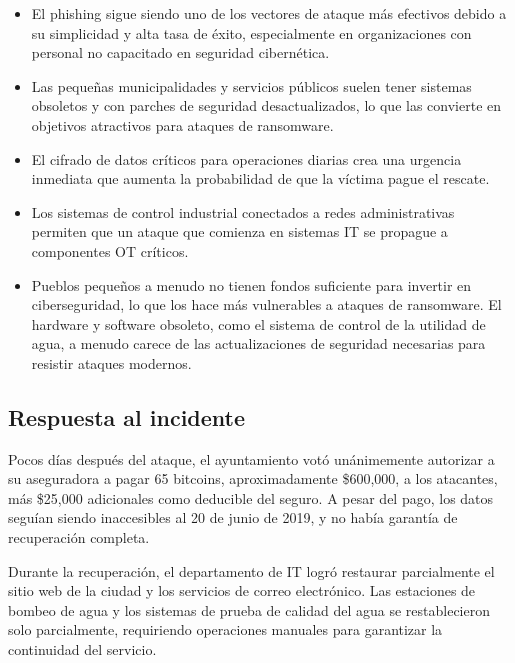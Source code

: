 \begin{itemize}
    \item El phishing sigue siendo uno de los vectores de ataque más efectivos debido a su simplicidad y alta tasa de éxito, especialmente en organizaciones con personal no capacitado en seguridad cibernética.
    
    \item Las pequeñas municipalidades y servicios públicos suelen tener sistemas obsoletos y con parches de seguridad desactualizados, lo que las convierte en objetivos atractivos para ataques de ransomware.
    
    \item El cifrado de datos críticos para operaciones diarias crea una urgencia inmediata que aumenta la probabilidad de que la víctima pague el rescate.
    
    \item Los sistemas de control industrial conectados a redes administrativas permiten que un ataque que comienza en sistemas IT se propague a componentes OT críticos.
    
    \item Pueblos pequeños a menudo no tienen fondos suficiente para invertir en ciberseguridad, lo que los hace más vulnerables a ataques de ransomware.
    El hardware y software obsoleto, como el sistema de control de la utilidad de agua, a menudo carece de las actualizaciones de seguridad necesarias para resistir ataques modernos.
\end{itemize}



\subsection{Respuesta al incidente}
Pocos días después del ataque, el ayuntamiento votó unánimemente autorizar a su aseguradora a pagar 65 bitcoins, aproximadamente \$600,000, a los atacantes, más \$25,000 adicionales como deducible del seguro. A pesar del pago, los datos seguían siendo inaccesibles al 20 de junio de 2019, y no había garantía de recuperación completa.

Durante la recuperación, el departamento de IT logró restaurar parcialmente el sitio web de la ciudad y los servicios de correo electrónico. Las estaciones de bombeo de agua y los sistemas de prueba de calidad del agua se restablecieron solo parcialmente, requiriendo operaciones manuales para garantizar la continuidad del servicio.

